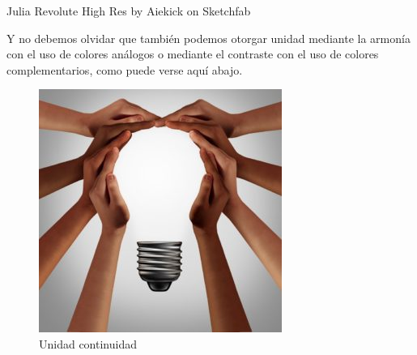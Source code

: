 \documentclass[16pt,]{krantz}
\theoremstyle{definition}
\theoremstyle{definition}
\theoremstyle{definition}
\theoremstyle{definition}
\theoremstyle{remark}
\begin{document}
Julia Revolute High Res by Aiekick on Sketchfab

Y no debemos olvidar que también podemos otorgar unidad mediante la armonía con el uso de colores análogos o mediante el contraste con el uso de colores complementarios, como puede verse aquí abajo.

\begin{figure}

{\centering \includegraphics[width=1\linewidth,height=1\textheight]{unidad1} 

}

\caption{Unidad continuidad}\label{fig:unidad1}
\end{figure}
\end{document}
